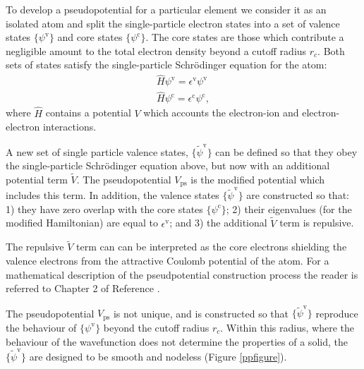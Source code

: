 To develop a pseudopotential for a particular element we consider it as an isolated atom and split the single-particle electron states into a set of valence states $\{\psi^\mathrm{v}\}$ and core states $\{\psi^\mathrm{c}\}$.\autocite{Kaxiras2007} The core states are those which contribute a negligible amount to the total electron density beyond a cutoff radius $r_c$. Both sets of states satisfy the single-particle Schr\"{o}dinger equation for the atom:
\begin{align} \label{speqn}
\hat{H}\psi^\mathrm{v} = \epsilon^\mathrm{v}\psi^\mathrm{v} \\
\hat{H}\psi^\mathrm{c} = \epsilon^\mathrm{c}\psi^\mathrm{c},
\end{align}
where $\hat{H}$ contains a potential $V$ which accounts the electron-ion and electron-electron interactions.

A new set of single particle valence states, $\{\tilde{\psi}^\mathrm{v}\}$ can be defined so that they obey the single-particle Schr\"{o}dinger equation above, but now with an additional potential term $\tilde{V}$. 
The pseudopotential $V_\mathrm{ps}$ is the modified potential which includes this term.
In addition, the valence states $\{\tilde{\psi}^\mathrm{v}\}$ are constructed so that: 1) they have zero overlap with the core states $\{\psi^\mathrm{c}\}$; 2) their eigenvalues (for the modified Hamiltonian) are equal to $\epsilon^\mathrm{v}$; and 3) the additional $\tilde{V}$ term is repulsive.

The repulsive $\tilde{V}$ term can can be interpreted as the core electrons shielding the valence electrons from the attractive Coulomb potential of the atom. For a mathematical description of the pseudpotential construction process the reader is referred to Chapter 2 of Reference \cite{Kaxiras2007}.

The pseudopotential $V_\mathrm{ps}$ is not unique, and is constructed so that $\{\tilde{\psi}^\mathrm{v}\}$ reproduce the behaviour of $\{\psi^\mathrm{v}\}$ beyond the cutoff radius $r_c$. Within this radius, where the behaviour of the wavefunction does not determine the properties of a solid, the $\{\tilde{\psi}^\mathrm{v}\}$ are designed to be smooth and nodeless (Figure \ref{ppfigure}).

